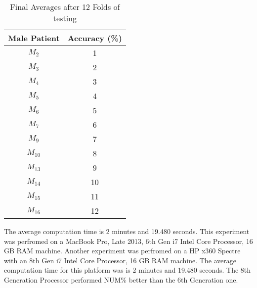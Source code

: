 \begin{table}[h!]
\centering
\begin{tabular}{||c c||} 
\hline
Male Patient & Accuracy (\%)  \\ [0.5ex] 
\hline \hline
$M_2$ & 1  \\ 
\hline
$M_3$ & 2  \\ 
\hline
$M_4$ & 3  \\ 
\hline
$M_5$ & 4  \\ 
\hline
$M_6$ & 5  \\ 
\hline
$M_7$ & 6  \\ 
\hline
$M_9$ & 7  \\ 
\hline
$M_{10}$ & 8  \\ 
\hline
$M_{13}$ & 9  \\ 
\hline
$M_{14}$ & 10  \\ 
\hline
$M_{15}$ & 11  \\ 
\hline 
$M_{16}$ & 12  \\ 
\hline 
\hline
\end{tabular}
\caption{Final Averages after 12 Folds of testing}
\label{table:results}
\end{table}

The average computation time is 2 minutes and 19.480 seconds. This experiment was 
perfromed on a MacBook Pro, Late 2013, 6th Gen i7 Intel Core Processor, 16 GB 
RAM machine. Another experiment was perfromed on a HP x360 Spectre with an 8th Gen i7 Intel 
Core Processor, 16 GB RAM machine. The average computation time 
for this platform was is 2 minutes and 19.480 seconds. The 8th Generation 
Processor performed NUM\% better than the 6th Generation one.